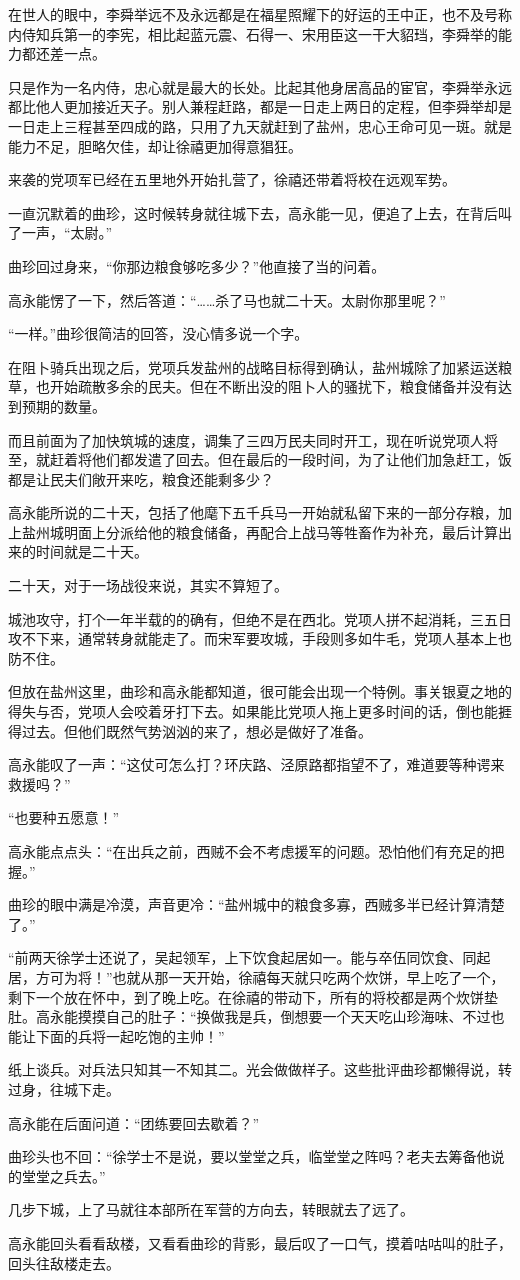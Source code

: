 在世人的眼中，李舜举远不及永远都是在福星照耀下的好运的王中正，也不及号称内侍知兵第一的李宪，相比起蓝元震、石得一、宋用臣这一干大貂珰，李舜举的能力都还差一点。

只是作为一名内侍，忠心就是最大的长处。比起其他身居高品的宦官，李舜举永远都比他人更加接近天子。别人兼程赶路，都是一日走上两日的定程，但李舜举却是一日走上三程甚至四成的路，只用了九天就赶到了盐州，忠心王命可见一斑。就是能力不足，胆略欠佳，却让徐禧更加得意猖狂。

来袭的党项军已经在五里地外开始扎营了，徐禧还带着将校在远观军势。

一直沉默着的曲珍，这时候转身就往城下去，高永能一见，便追了上去，在背后叫了一声，“太尉。”

曲珍回过身来，“你那边粮食够吃多少？”他直接了当的问着。

高永能愣了一下，然后答道：“……杀了马也就二十天。太尉你那里呢？”

“一样。”曲珍很简洁的回答，没心情多说一个字。

在阻卜骑兵出现之后，党项兵发盐州的战略目标得到确认，盐州城除了加紧运送粮草，也开始疏散多余的民夫。但在不断出没的阻卜人的骚扰下，粮食储备并没有达到预期的数量。

而且前面为了加快筑城的速度，调集了三四万民夫同时开工，现在听说党项人将至，就赶着将他们都发遣了回去。但在最后的一段时间，为了让他们加急赶工，饭都是让民夫们敞开来吃，粮食还能剩多少？

高永能所说的二十天，包括了他麾下五千兵马一开始就私留下来的一部分存粮，加上盐州城明面上分派给他的粮食储备，再配合上战马等牲畜作为补充，最后计算出来的时间就是二十天。

二十天，对于一场战役来说，其实不算短了。

城池攻守，打个一年半载的的确有，但绝不是在西北。党项人拼不起消耗，三五日攻不下来，通常转身就能走了。而宋军要攻城，手段则多如牛毛，党项人基本上也防不住。

但放在盐州这里，曲珍和高永能都知道，很可能会出现一个特例。事关银夏之地的得失与否，党项人会咬着牙打下去。如果能比党项人拖上更多时间的话，倒也能捱得过去。但他们既然气势汹汹的来了，想必是做好了准备。

高永能叹了一声：“这仗可怎么打？环庆路、泾原路都指望不了，难道要等种谔来救援吗？”

“也要种五愿意！”

高永能点点头：“在出兵之前，西贼不会不考虑援军的问题。恐怕他们有充足的把握。”

曲珍的眼中满是冷漠，声音更冷：“盐州城中的粮食多寡，西贼多半已经计算清楚了。”

“前两天徐学士还说了，吴起领军，上下饮食起居如一。能与卒伍同饮食、同起居，方可为将！”也就从那一天开始，徐禧每天就只吃两个炊饼，早上吃了一个，剩下一个放在怀中，到了晚上吃。在徐禧的带动下，所有的将校都是两个炊饼垫肚。高永能摸摸自己的肚子：“换做我是兵，倒想要一个天天吃山珍海味、不过也能让下面的兵将一起吃饱的主帅！”

纸上谈兵。对兵法只知其一不知其二。光会做做样子。这些批评曲珍都懒得说，转过身，往城下走。

高永能在后面问道：“团练要回去歇着？”

曲珍头也不回：“徐学士不是说，要以堂堂之兵，临堂堂之阵吗？老夫去筹备他说的堂堂之兵去。”

几步下城，上了马就往本部所在军营的方向去，转眼就去了远了。

高永能回头看看敌楼，又看看曲珍的背影，最后叹了一口气，摸着咕咕叫的肚子，回头往敌楼走去。

